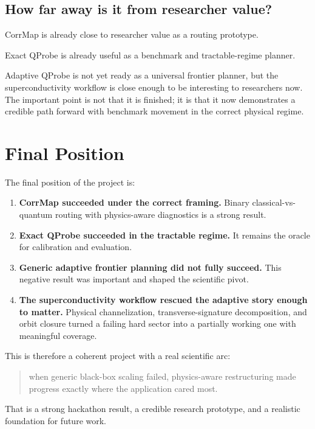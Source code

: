 \documentclass[11pt]{article}
\begin{document}
\subsection{How far away is it from researcher value?}

CorrMap is already close to researcher value as a routing prototype.

Exact QProbe is already useful as a benchmark and tractable-regime planner.

Adaptive QProbe is not yet ready as a universal frontier planner, but the superconductivity workflow is close enough to be interesting to researchers now. The important point is not that it is finished; it is that it now demonstrates a credible path forward with benchmark movement in the correct physical regime.

\section{Final Position}

The final position of the project is:

\begin{enumerate}[label=\arabic*.]
\item \textbf{CorrMap succeeded under the correct framing.}
Binary classical-vs-quantum routing with physics-aware diagnostics is a strong result.

\item \textbf{Exact QProbe succeeded in the tractable regime.}
It remains the oracle for calibration and evaluation.

\item \textbf{Generic adaptive frontier planning did not fully succeed.}
This negative result was important and shaped the scientific pivot.

\item \textbf{The superconductivity workflow rescued the adaptive story enough to matter.}
Physical channelization, transverse-signature decomposition, and orbit closure turned a failing hard sector into a partially working one with meaningful coverage.
\end{enumerate}

This is therefore a coherent project with a real scientific arc:

\begin{quote}
when generic black-box scaling failed, physics-aware restructuring made progress exactly where the application cared most.
\end{quote}

That is a strong hackathon result, a credible research prototype, and a realistic foundation for future work.
\end{document}
